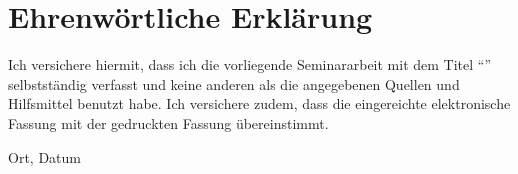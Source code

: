 \clearpage
\chapter*{Ehrenwörtliche Erklärung}


Ich versichere hiermit, dass ich die vorliegende Seminararbeit mit dem Titel ``\textit{\DerTitelDerArbeit}'' selbstständig verfasst und 
keine anderen als die angegebenen Quellen und Hilfsmittel benutzt habe. Ich versichere zudem, dass die eingereichte elektronische 
Fassung mit der gedruckten Fassung übereinstimmt.

\vspace{3cm}
Ort, Datum \hfill \DerAutorDerArbeit

